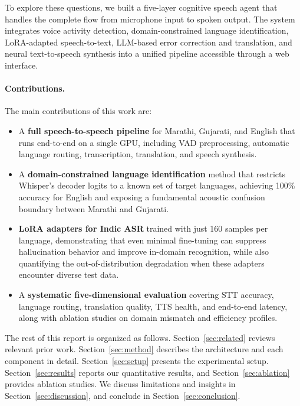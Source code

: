 To explore these questions, we built a five-layer cognitive speech agent that handles the complete flow from microphone input to spoken output. The system integrates voice activity detection, domain-constrained language identification, LoRA-adapted speech-to-text, LLM-based error correction and translation, and neural text-to-speech synthesis into a unified pipeline accessible through a web interface.

\paragraph{Contributions.} The main contributions of this work are:

\begin{itemize}[leftmargin=*]
    \item A \textbf{full speech-to-speech pipeline} for Marathi, Gujarati, and English that runs end-to-end on a single GPU, including VAD preprocessing, automatic language routing, transcription, translation, and speech synthesis.

    \item A \textbf{domain-constrained language identification} method that restricts Whisper's decoder logits to a known set of target languages, achieving 100\% accuracy for English and exposing a fundamental acoustic confusion boundary between Marathi and Gujarati.

    \item \textbf{LoRA adapters for Indic ASR} trained with just 160 samples per language, demonstrating that even minimal fine-tuning can suppress hallucination behavior and improve in-domain recognition, while also quantifying the out-of-distribution degradation when these adapters encounter diverse test data.

    \item A \textbf{systematic five-dimensional evaluation} covering STT accuracy, language routing, translation quality, TTS health, and end-to-end latency, along with ablation studies on domain mismatch and efficiency profiles.
\end{itemize}

The rest of this report is organized as follows. Section~\ref{sec:related} reviews relevant prior work. Section~\ref{sec:method} describes the architecture and each component in detail. Section~\ref{sec:setup} presents the experimental setup. Section~\ref{sec:results} reports our quantitative results, and Section~\ref{sec:ablation} provides ablation studies. We discuss limitations and insights in Section~\ref{sec:discussion}, and conclude in Section~\ref{sec:conclusion}.
